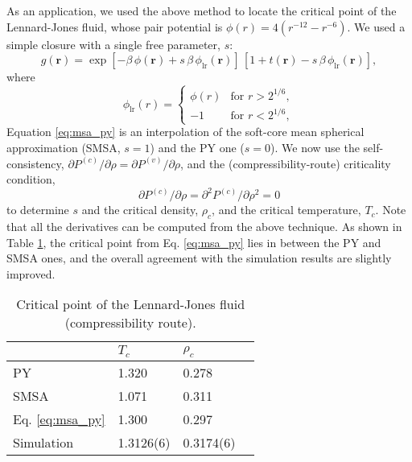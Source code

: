 \documentclass[aip,jcp,preprint,superscriptaddress,showpacs,preprintnumbers,amsmath,amssymb]{revtex4-1}
\numberwithin{equation}{section}
\newcommand{\vct}[1]{\mathbf{#1}}
\providecommand{\vr}{} %
\renewcommand{\vr}{\vct{r}}
\begin{document}
As an application,
we used the above method to locate the critical point
of the Lennard-Jones fluid\cite{
henderson1970, *henderson1972},
whose pair potential is
$\phi(r) = 4 (r^{-12} - r^{-6})$.
%
We used a simple closure with a single free parameter, $s$:
%
%
%
\begin{equation}
g(\vr)
=
\exp[-\beta\,\phi(\vr) + s\,\beta\,\phi_{\mathrm{lr}}(\vr)]
\, [1 + t(\vr) - s\,\beta\,\phi_{\mathrm{lr}}(\vr)],
\label{eq:msa_py}
\end{equation}
%
where
%
\begin{equation*}
\phi_{\mathrm{lr}}(r)
=
\begin{cases}
\phi(r) & \mbox{for $r > 2^{1/6}$}, \\
-1      & \mbox{for $r < 2^{1/6}$},
\end{cases}
\end{equation*}
%
Equation \eqref{eq:msa_py}
is an interpolation of
the soft-core mean spherical approximation
(SMSA, $s = 1$)\cite{chihara1973, *madden1980, *zerah1986}
and the PY one ($s = 0$).
%
We now use the self-consistency,
$\partial P^{(c)}/\partial \rho
= \partial P^{(v)}/\partial \rho$,
and the (compressibility-route) criticality condition,
\[
\partial P^{(c)} / \partial \rho
=
\partial^2 P^{(c)} / \partial \rho^2 = 0
\]
%
to determine $s$ and the critical density, $\rho_c$,
and the critical temperature, $T_c$.
%
Note that
all the derivatives can be computed from the above technique.
%
As shown in Table \ref{tab:ljcritical},
the critical point from Eq. \eqref{eq:msa_py}
lies in between the PY and SMSA ones,
and the overall agreement
with the simulation results\cite{perez-pellitero2006}
are slightly improved.



\begin{table}
\begin{tabular}{ l l l l }
\hline
&
$T_c$
&
$\rho_c$
\\ \hline
%
PY\cite{henderson1970, *henderson1972}
&
1.320
&
0.278
\\
%
SMSA
&
1.071
&
0.311
\\
%
Eq. \eqref{eq:msa_py}
&
1.300
&
0.297
\\ \hline
%
Simulation\cite{perez-pellitero2006}
&
1.3126(6)
&
0.3174(6)
\\ \hline
%
\end{tabular}
\caption{
Critical point of the Lennard-Jones fluid
(compressibility route).
}
\label{tab:ljcritical}
\end{table}
\end{document}
